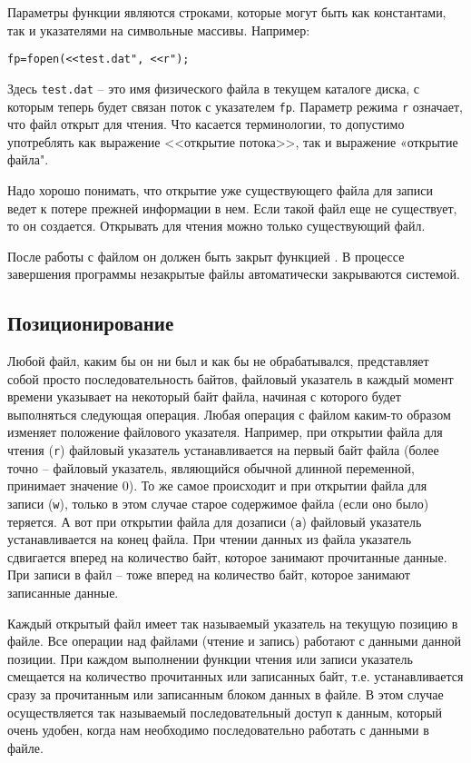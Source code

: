 Параметры функции  являются строками, которые могут быть как константами, так и указателями на символьные массивы. Например:

\begin{verbatim}
fp=fopen(<<test.dat", <<r");
\end{verbatim}

Здесь \verb|test.dat| – это имя физического файла в текущем каталоге диска, с которым теперь будет связан поток с указателем \verb|fp|.
Параметр режима \verb|r| означает, что файл открыт для чтения. Что касается терминологии, то допустимо употреблять как выражение
<<открытие потока>>, так и выражение «открытие файла".

Надо хорошо понимать, что открытие уже существующего файла для записи ведет к потере прежней информации в нем. Если такой файл еще
не существует, то он создается. Открывать для чтения можно только существующий файл.

После работы с файлом он должен быть закрыт функцией . В процессе завершения программы незакрытые файлы автоматически закрываются системой.

\subsection{Позиционирование}
Любой файл, каким бы он ни был и как бы не обрабатывался, представляет собой просто последовательность байтов, файловый
указатель в каждый момент времени указывает на некоторый байт файла, начиная с которого будет выполняться следующая
операция. Любая операция с файлом каким-то образом изменяет положение файлового указателя. Например, при открытии файла
для чтения (\verb|r|) файловый указатель устанавливается на первый байт файла (более точно – файловый указатель, являющийся
обычной длинной переменной, принимает значение 0). То же самое происходит и при открытии файла для записи (\verb|w|), только
в этом случае старое содержимое файла (если оно было) теряется. А вот при открытии файла для дозаписи (\verb|a|) файловый
указатель устанавливается на конец файла. При чтении данных из файла указатель сдвигается вперед на количество байт, которое
занимают прочитанные данные. При записи в файл – тоже вперед на количество байт, которое занимают записанные данные.

Каждый открытый файл имеет так называемый указатель на текущую позицию в файле. Все операции над файлами (чтение и запись)
работают с данными данной позиции. При каждом выполнении функции чтения или записи указатель смещается на количество прочитанных
или записанных байт, т.е. устанавливается сразу за прочитанным или записанным блоком данных в файле. В этом случае осуществляется
так называемый последовательный доступ к данным, который очень удобен, когда нам необходимо последовательно работать с данными в файле.



